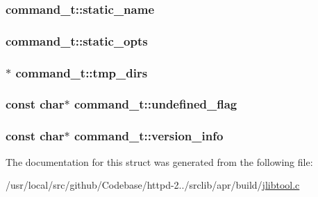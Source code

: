\subsubsection[{\texorpdfstring{static\+\_\+name}{static_name}}]{ command\+\_\+t\+::static\+\_\+name}\hypertarget{structcommand__t_a01000f3a9b0c640de2b4e7ecf8fe963d}{}\label{structcommand__t_a01000f3a9b0c640de2b4e7ecf8fe963d}
\subsubsection[{\texorpdfstring{static\+\_\+opts}{static_opts}}]{ command\+\_\+t\+::static\+\_\+opts}\hypertarget{structcommand__t_af8226723c019e4346a0e58f8cf60969f}{}\label{structcommand__t_af8226723c019e4346a0e58f8cf60969f}
\subsubsection[{\texorpdfstring{tmp\+\_\+dirs}{tmp_dirs}}]{$\ast$ command\+\_\+t\+::tmp\+\_\+dirs}\hypertarget{structcommand__t_a59ce72a2d719f4c49e3027aa41abe86a}{}\label{structcommand__t_a59ce72a2d719f4c49e3027aa41abe86a}
\subsubsection[{\texorpdfstring{undefined\+\_\+flag}{undefined_flag}}]{\setlength{\rightskip}{0pt plus 5cm}const char$\ast$ command\+\_\+t\+::undefined\+\_\+flag}\hypertarget{structcommand__t_a6a8b2427bbd4cb4bbe5e7470a109ebe5}{}\label{structcommand__t_a6a8b2427bbd4cb4bbe5e7470a109ebe5}
\subsubsection[{\texorpdfstring{version\+\_\+info}{version_info}}]{\setlength{\rightskip}{0pt plus 5cm}const char$\ast$ command\+\_\+t\+::version\+\_\+info}\hypertarget{structcommand__t_a0481afee06e3820c8f43a5ccc7bdaed2}{}\label{structcommand__t_a0481afee06e3820c8f43a5ccc7bdaed2}


The documentation for this struct was generated from the following file\+:\begin{DoxyCompactItemize}
\item 
/usr/local/src/github/\+Codebase/httpd-\/2../srclib/apr/build/\hyperlink{jlibtool_8c}{jlibtool.\+c}\end{DoxyCompactItemize}
